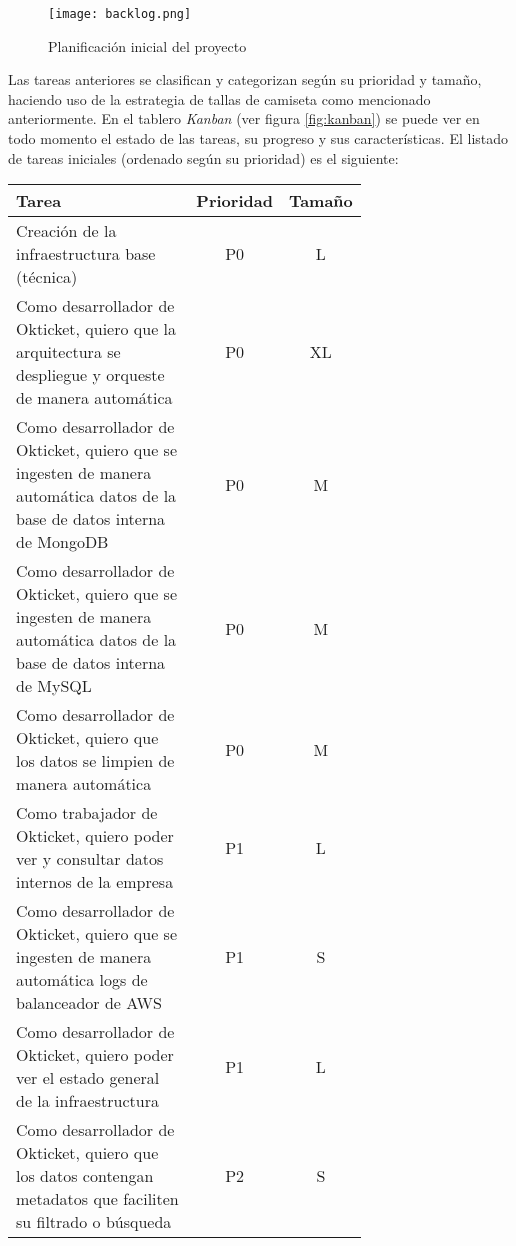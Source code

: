 \begin{figure}[H]
	\centering
	\texttt{[image: backlog.png]}
	\caption{Planificación inicial del proyecto}
	\label{fig:backlog}
\end{figure}

Las tareas anteriores se clasifican y categorizan según su prioridad y tamaño,
haciendo uso de la estrategia de tallas de camiseta como mencionado
anteriormente. En el tablero \textit{Kanban} (ver figura \ref{fig:kanban}) se
puede ver en todo momento el estado de las tareas, su progreso y sus
características. El listado de tareas iniciales (ordenado según su prioridad)
es el siguiente:

\begin{table}[H]
	\centering
	\begin{tabular}{|p{0.7\linewidth}|c|c|}
		\hline
		\textbf{Tarea} & \textbf{Prioridad} & \textbf{Tamaño} \\
		\hline
		\hline
		Creación de la infraestructura base (técnica) & P0\cellcolor{red!50} & L\cellcolor{orange!50} \\
		\hline
		Como desarrollador de Okticket, quiero que la arquitectura se despliegue y orqueste de manera automática & P0\cellcolor{red!50} & XL\cellcolor{red!50} \\
		\hline
		Como desarrollador de Okticket, quiero que se ingesten de manera automática datos de la base de datos interna de MongoDB & P0\cellcolor{red!50} & M\cellcolor{yellow!50} \\
		\hline
		Como desarrollador de Okticket, quiero que se ingesten de manera automática datos de la base de datos interna de MySQL & P0\cellcolor{red!50} & M\cellcolor{yellow!50} \\
		\hline
		Como desarrollador de Okticket, quiero que los datos se limpien de manera automática & P0\cellcolor{red!50} & M\cellcolor{yellow!50} \\
		\hline
		Como trabajador de Okticket, quiero poder ver y consultar datos internos de la empresa & P1\cellcolor{orange!50} & L\cellcolor{orange!50} \\
		\hline
		Como desarrollador de Okticket, quiero que se ingesten de manera automática logs de balanceador de AWS & P1\cellcolor{orange!50} & S\cellcolor{green!25} \\
		\hline
		Como desarrollador de Okticket, quiero poder ver el estado general de la infraestructura & P1\cellcolor{orange!50} & L\cellcolor{orange!50} \\
		\hline
		Como desarrollador de Okticket, quiero que los datos contengan metadatos que faciliten su filtrado o búsqueda & P2\cellcolor{yellow!50} & S\cellcolor{green!25} \\

\end{tabular}
\end{table}
